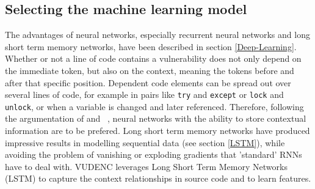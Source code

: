 \documentclass[
	a4paper,
	pagesize,
	pdftex,
	12pt,
	twoside, %
	BCOR=5mm, %
	ngerman,
	fleqn,
	final,
	]{scrartcl}
\begin{document}
\subsection{Selecting the machine learning model}
The advantages of neural networks, especially recurrent neural networks and long short term memory networks, have been described in section \ref{Deep-Learning}. 
Whether or not a line of code contains a vulnerability does not only depend on the immediate token, but also on the context, meaning the tokens before and after that specific position. Dependent code elements can be spread out over several lines of code, for example in pairs like \texttt{try} and \texttt{except} or \texttt{lock} and \texttt{unlock}, or when a variable is changed and later referenced. Therefore, following the argumentation of \cite{Liu.2018} and ~\cite{Dam.2017}, neural networks with the ability to store contextual information are to be prefered. Long short term memory networks have produced impressive results in modelling sequential data (see section \ref{LSTM}), while avoiding the problem of vanishing or exploding gradients that 'standard' RNNs have to deal with. VUDENC leverages Long Short Term Memory Networks (LSTM) to capture the context relationships in source code and to learn features. 
\end{document}
